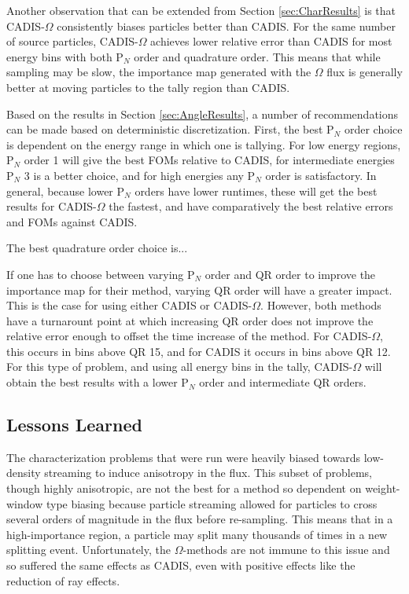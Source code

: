 Another observation that can be extended from Section \ref{sec:CharResults} is
that CADIS-$\Omega$ consistently biases
particles better than CADIS. For the same number of source particles,
CADIS-$\Omega$
achieves lower relative error than CADIS for most energy bins with both P$_N$
order and quadrature order. This means that while sampling may be slow, the
importance map generated with the $\Omega$ flux is generally
better at moving particles to the tally region than
CADIS.

Based on the results in Section \ref{sec:AngleResults}, a number of
recommendations can be made based on deterministic discretization. First, the
best P$_N$ order choice is
dependent on the energy range in which one is tallying. For low energy regions,
P$_N$ order 1 will give the best FOMs relative to CADIS, for intermediate
energies P$_N$ 3 is a better choice, and for high energies any P$_N$ order is
satisfactory. In general, because lower P$_N$ orders have lower runtimes, these
will get the best results for CADIS-$\Omega$ the fastest, and have comparatively
the best relative errors and FOMs against CADIS. 

The best quadrature order
choice is...

If one has to choose between varying P$_N$ order and QR order to improve the
importance map for their method, varying QR order will have a greater impact.
This is the case for using either CADIS or CADIS-$\Omega$. However, both methods
have a turnarount point at which increasing QR order does not improve the
relative error enough to offset the time increase of the method. For
CADIS-$\Omega$, this occurs in bins above QR 15, and for CADIS it occurs in
bins above QR 12. For this type of problem, and using all energy bins in the
tally, CADIS-$\Omega$ will obtain the
best results with a lower P$_N$ order and intermediate QR orders.%

\subsection{Lessons Learned}
\label{sec:lesslearn}

The characterization problems that were run were heavily biased towards
low-density streaming to induce anisotropy in the flux. This subset of
problems, though highly anisotropic, are not the best
for a method so dependent on weight-window type biasing
because particle streaming allowed for particles to cross several orders of
magnitude in the flux before re-sampling. This means that in a high-importance
region, a particle may split many thousands of times in a new splitting event.
Unfortunately, the $\Omega$-methods are not immune to this issue and so suffered
the same effects as CADIS, even with positive effects like the reduction of ray
effects. 

